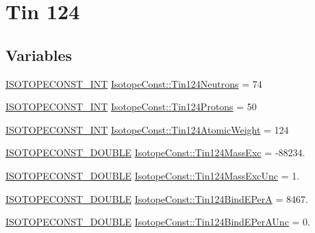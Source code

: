 \hypertarget{group___isotope_const-_tin-_sn124}{}\section{Tin 124}
\label{group___isotope_const-_tin-_sn124}
\subsection*{Variables}
\begin{DoxyCompactItemize}
\item 
\mbox{\hyperlink{group___isotope_const-_macros_ga5f18360b3e99483a35c32d789e62621c}{I\+S\+O\+T\+O\+P\+E\+C\+O\+N\+S\+T\+\_\+\+I\+NT}} \mbox{\hyperlink{group___isotope_const-_tin-_sn124_ga6e1c61423234cbaba841b10400450cbe}{Isotope\+Const\+::\+Tin124\+Neutrons}} = 74
\item 
\mbox{\hyperlink{group___isotope_const-_macros_ga5f18360b3e99483a35c32d789e62621c}{I\+S\+O\+T\+O\+P\+E\+C\+O\+N\+S\+T\+\_\+\+I\+NT}} \mbox{\hyperlink{group___isotope_const-_tin-_sn124_ga9e28033fd66ed5bf594d3dbe2e5ca120}{Isotope\+Const\+::\+Tin124\+Protons}} = 50
\item 
\mbox{\hyperlink{group___isotope_const-_macros_ga5f18360b3e99483a35c32d789e62621c}{I\+S\+O\+T\+O\+P\+E\+C\+O\+N\+S\+T\+\_\+\+I\+NT}} \mbox{\hyperlink{group___isotope_const-_tin-_sn124_ga9e7696b5282b9a0d37e4e047a2ea6e5f}{Isotope\+Const\+::\+Tin124\+Atomic\+Weight}} = 124
\item 
\mbox{\hyperlink{group___isotope_const-_macros_ga8f45a7272ce02c0b4c65c44636ed719a}{I\+S\+O\+T\+O\+P\+E\+C\+O\+N\+S\+T\+\_\+\+D\+O\+U\+B\+LE}} \mbox{\hyperlink{group___isotope_const-_tin-_sn124_ga68f5b09496522caf38c0eba2d129e189}{Isotope\+Const\+::\+Tin124\+Mass\+Exc}} = -\/88234.
\item 
\mbox{\hyperlink{group___isotope_const-_macros_ga8f45a7272ce02c0b4c65c44636ed719a}{I\+S\+O\+T\+O\+P\+E\+C\+O\+N\+S\+T\+\_\+\+D\+O\+U\+B\+LE}} \mbox{\hyperlink{group___isotope_const-_tin-_sn124_gacdfa71db3844e12caeffab38debfd5c2}{Isotope\+Const\+::\+Tin124\+Mass\+Exc\+Unc}} = 1.
\item 
\mbox{\hyperlink{group___isotope_const-_macros_ga8f45a7272ce02c0b4c65c44636ed719a}{I\+S\+O\+T\+O\+P\+E\+C\+O\+N\+S\+T\+\_\+\+D\+O\+U\+B\+LE}} \mbox{\hyperlink{group___isotope_const-_tin-_sn124_gaa46706c7c758063fd1c94907c5188a13}{Isotope\+Const\+::\+Tin124\+Bind\+E\+PerA}} = 8467.
\item 
\mbox{\hyperlink{group___isotope_const-_macros_ga8f45a7272ce02c0b4c65c44636ed719a}{I\+S\+O\+T\+O\+P\+E\+C\+O\+N\+S\+T\+\_\+\+D\+O\+U\+B\+LE}} \mbox{\hyperlink{group___isotope_const-_tin-_sn124_gafa387daf114a3b6637ca974cdf925389}{Isotope\+Const\+::\+Tin124\+Bind\+E\+Per\+A\+Unc}} = 0.

\end{DoxyCompactItemize}
